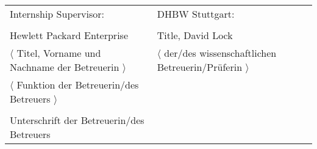 \begin{spacing}{1}
\begin{tabular}{ll}
Internship Supervisor: & DHBW Stuttgart: \\
\hspace{0.4\linewidth} & \\
Hewlett Packard Enterprise & Title, David Lock \\
$\langle$ Titel, Vorname und Nachname der Betreuerin $\rangle$ 
& $\langle$ der/des wissenschaftlichen Betreuerin/Prüferin $\rangle$ \\
$\langle$ Funktion der Betreuerin/des Betreuers $\rangle$ \\
\\
Unterschrift der Betreuerin/des Betreuers \\
\end{tabular}


\vspace{1cm}
\end{spacing}

 

